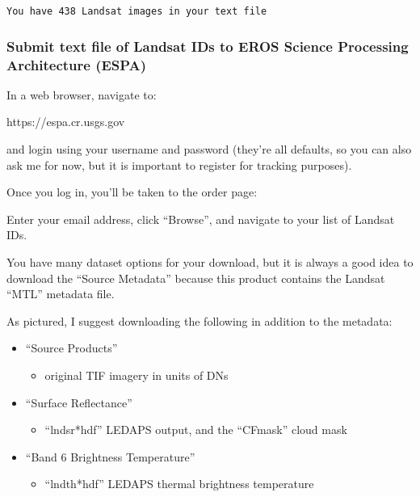 \documentclass{article}
\begin{document}
    \begin{Verbatim}[commandchars=\\\{\}]
You have 438 Landsat images in your text file
    \end{Verbatim}

    \subsubsection{Submit text file of Landsat IDs to EROS Science
Processing Architecture (ESPA)}

In a web browser, navigate to:

https://espa.cr.usgs.gov

and login using your username and password (they're all defaults, so you
can also ask me for now, but it is important to register for tracking
purposes).

Once you log in, you'll be taken to the order page:

Enter your email address, click ``Browse'', and navigate to your list of
Landsat IDs.

You have many dataset options for your download, but it is always a good
idea to download the ``Source Metadata'' because this product contains
the Landsat ``MTL'' metadata file.

As pictured, I suggest downloading the following in addition to the
metadata:

\begin{itemize}
\itemsep1pt\parskip0pt
\item
  ``Source Products''

  \begin{itemize}
  \itemsep1pt\parskip0pt
  \item
    original TIF imagery in units of DNs
  \end{itemize}
\item
  ``Surface Reflectance''

  \begin{itemize}
  \itemsep1pt\parskip0pt
  \item
    ``lndsr*hdf'' LEDAPS output, and the ``CFmask'' cloud mask
  \end{itemize}
\item
  ``Band 6 Brightness Temperature''

  \begin{itemize}
  \itemsep1pt\parskip0pt
  \item
    ``lndth*hdf'' LEDAPS thermal brightness temperature
  \end{itemize}
\end{itemize}
\end{document}

